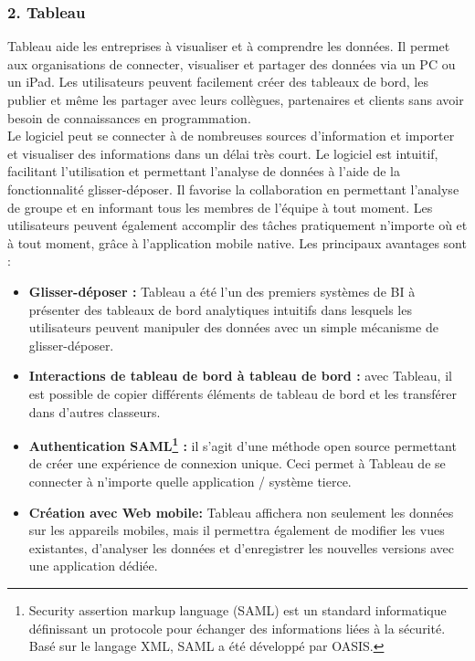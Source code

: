 \documentclass[french, a4paper, 12pt]{report}
\begin{document}
\subsubsection{2. Tableau}
 Tableau aide les entreprises à visualiser et à comprendre les données. Il permet aux organisations de connecter, visualiser et partager des données via un PC ou un iPad. Les utilisateurs peuvent facilement créer des tableaux de bord, les publier et même les partager avec leurs collègues, partenaires et clients sans avoir besoin de connaissances en programmation. \\
 Le logiciel peut se connecter à de nombreuses sources d’information et importer et visualiser des informations dans un délai très court. Le logiciel est intuitif, facilitant l’utilisation et permettant l’analyse de données à l’aide de la fonctionnalité glisser-déposer. Il favorise la collaboration en permettant l’analyse de groupe et en informant tous les membres de l’équipe à tout moment. Les utilisateurs peuvent également accomplir des tâches pratiquement n'importe où et à tout moment, grâce à l'application mobile native.  Les principaux avantages sont :
 \begin{itemize}
\item \textbf{Glisser-déposer :} Tableau a été l'un des premiers systèmes de BI à présenter des tableaux de bord analytiques intuitifs dans lesquels les utilisateurs peuvent manipuler des données avec un simple mécanisme de glisser-déposer.
\item \textbf{Interactions de tableau de bord à tableau de bord :}  avec Tableau, il est possible de copier différents éléments de tableau de bord et les transférer dans d'autres classeurs. 
\item \textbf{Authentication SAML\footnote{Security assertion markup language (SAML) est un standard informatique définissant un protocole pour échanger des informations liées à la sécurité. Basé sur le langage XML, SAML a été développé par OASIS.} :} il s’agit d’une méthode open source permettant de créer une expérience de connexion unique. Ceci permet à Tableau de se connecter à n’importe quelle application / système tierce.
\item \textbf{Création avec Web mobile:}  Tableau affichera non seulement les données sur les appareils mobiles, mais il permettra également de modifier les vues existantes, d'analyser les données et d'enregistrer les nouvelles versions avec une application dédiée.
\end{itemize} 
\end{document}
